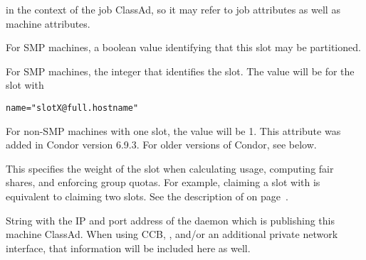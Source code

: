 \begin{description}
in the context of the job ClassAd, so it may refer to job attributes
as well as machine attributes.
%
\label{PartitionableSlot-machine-attribute} 
\item[\AdAttr{PartitionableSlot}:] For SMP machines,
a boolean value identifying that this slot may be partitioned.
%
\item[\AdAttr{SlotID}:] For SMP machines, the integer
that identifies the slot.
The value will be \verb@X@ for the slot with 
\begin{verbatim}
name="slotX@full.hostname"
\end{verbatim}
For non-SMP machines with one slot, the value will be 1.
\Note This attribute was added in Condor version 6.9.3.
For older versions of Condor, see  below.
%
\item[\AdAttr{SlotWeight}:]
  This specifies the weight of the slot when
  calculating usage, computing fair shares, and enforcing group
  quotas.  For example, claiming a slot with  is
  equivalent to claiming two  slots.
  See the description of  on
  page~\pageref{param:SlotWeight}.

%
\item[\AdAttr{StartdIpAddr}:] String with the IP and port address of the
 daemon which is publishing this machine ClassAd.
When using CCB, , and/or an additional private
network interface, that information will be included here as well.


\end{description}
